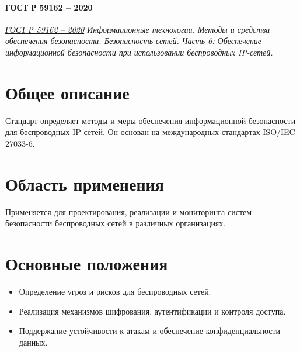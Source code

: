 \paragraph{ГОСТ Р 59162 -- 2020}
\emph{\href{https://rst.gov.ru:8443/file-service/file/load/1699366818935}{ГОСТ Р 59162 -- 2020}
Информационные технологии.
Методы и средства обеспечения безопасности.
Безопасность сетей. Часть 6: Обеспечение информационной безопасности при использовании беспроводных IP-сетей.}

\section*{Общее описание}
Стандарт определяет методы и меры обеспечения информационной безопасности для беспроводных IP-сетей. Он основан на международных стандартах ISO/IEC 27033-6.

\section*{Область применения}
Применяется для проектирования, реализации и мониторинга систем безопасности беспроводных сетей в различных организациях.

\section*{Основные положения}
\begin{itemize}
    \item Определение угроз и рисков для беспроводных сетей.
    \item Реализация механизмов шифрования, аутентификации и контроля доступа.
    \item Поддержание устойчивости к атакам и обеспечение конфиденциальности данных.
\end{itemize}
